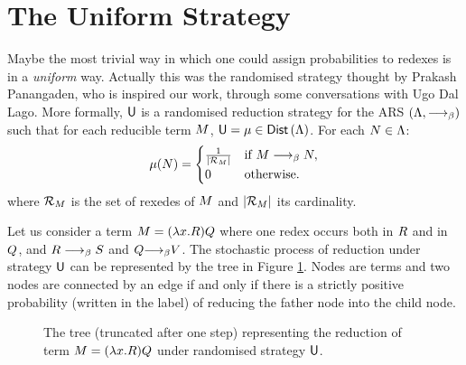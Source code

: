 \section{The Uniform Strategy}
Maybe the most trivial way in which one could assign probabilities to redexes is in a \emph{uniform} way. Actually this was the randomised strategy thought by Prakash Panangaden, who is inspired our work, through some conversations with Ugo Dal Lago. More formally, $\mathsf{U}$ is a randomised reduction strategy for the ARS $(\Lambda,\longrightarrow_\beta)$ such that for each reducible term $M$, ${\mathsf{U}=\mu\in\textsf{Dist}\left(\Lambda\right)}$. For each $N\in\Lambda$:
$$
\mu(N)=\begin{cases}
\frac{1}{|\mathcal{R}_{M}|} & \text{if }M\longrightarrow_\beta N ,\\
0 & \text{otherwise}.\\
\end{cases}
$$
where $\mathcal{R}_{M}$ is the set of rexedes of $M$ and $|\mathcal{R}_{M}|$ its cardinality.
\begin{example}
	Let us consider a term $M = (\lambda x.R)Q$
	where one redex occurs both in $R$ and in $Q$, and
	$R\longrightarrow_\beta S$ and
	$Q{\longrightarrow_\beta}V$. The stochastic process of reduction under strategy $\mathsf{U}$ can be represented by the tree in Figure \ref{figure:unitree}. Nodes are terms and two nodes are connected by an edge if and only if there is a strictly positive probability (written in the label) of reducing the father node into the child node.
\end{example}
\begin{figure}
	\begin{center}
		\end{center}
	\caption{The tree (truncated after one step) representing the reduction of term $M = (\lambda x.R)Q$ under randomised strategy $\mathsf{U}$.}
	\label{figure:unitree}
\end{figure}
